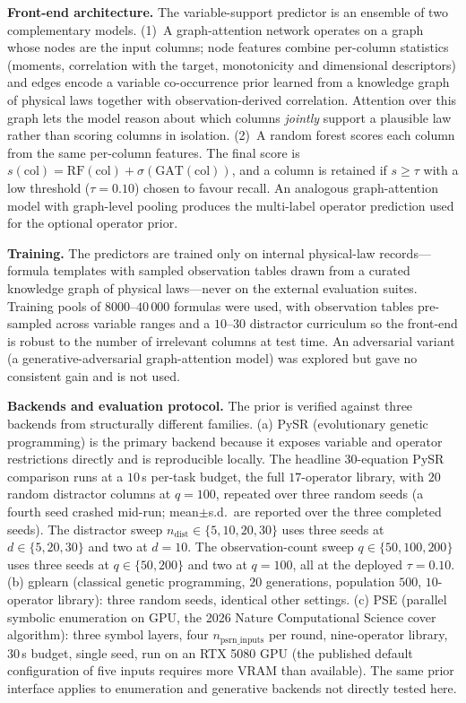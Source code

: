 \documentclass[11pt]{article}
\begin{document}
\noindent\textbf{Front-end architecture.} The variable-support predictor is an
ensemble of two complementary models. (1)~A graph-attention
network\cite{lee2019settransformer,zaheer2017deepsets} operates on a graph whose
nodes are the input columns; node features combine per-column statistics (moments,
correlation with the target, monotonicity and dimensional descriptors) and edges
encode a variable co-occurrence prior learned from a knowledge graph of physical
laws together with observation-derived correlation. Attention over this graph lets
the model reason about which columns \emph{jointly} support a plausible law rather
than scoring columns in isolation. (2)~A random forest scores each column from the
same per-column features. The final score is
$s(\mathrm{col})=\mathrm{RF}(\mathrm{col})+\sigma(\mathrm{GAT}(\mathrm{col}))$, and a
column is retained if $s\ge\tau$ with a low threshold ($\tau=0.10$) chosen to favour
recall. An analogous graph-attention model with graph-level pooling produces the
multi-label operator prediction used for the optional operator prior.

\noindent\textbf{Training.} The predictors are trained only on internal
physical-law records---formula templates with sampled observation tables drawn from
a curated knowledge graph of physical laws---never on the external evaluation suites.
Training pools of $8000$--$40\,000$ formulas were used, with observation tables
pre-sampled across variable ranges and a $10$--$30$ distractor curriculum so the
front-end is robust to the number of irrelevant columns at test time. An adversarial
variant (a generative-adversarial graph-attention model) was explored but gave no
consistent gain and is not used.

\noindent\textbf{Backends and evaluation protocol.} The prior is verified
against three backends from structurally different families. (a)
PySR\cite{cranmer2023pysr} (evolutionary genetic programming) is the primary
backend because it exposes variable and operator restrictions directly and is
reproducible locally. The headline $30$-equation PySR comparison runs at a
$10$\,s per-task budget, the full $17$-operator library, with $20$ random
distractor columns at $q=100$, repeated over three random seeds (a fourth seed
crashed mid-run; mean${\pm}$s.d.\ are reported over the three completed seeds).
The distractor sweep $n_{\mathrm{dist}}\in\{5,10,20,30\}$ uses three seeds at
$d\in\{5,20,30\}$ and two at $d{=}10$. The observation-count sweep
$q\in\{50,100,200\}$ uses three seeds at $q\in\{50,200\}$ and two at $q{=}100$,
all at the deployed $\tau{=}0.10$. (b) gplearn\cite{stephens2015gplearn}
(classical genetic programming, $20$ generations, population $500$,
$10$-operator library): three random seeds, identical other settings. (c)
PSE\cite{ruan2026pse} (parallel symbolic enumeration on GPU, the 2026 Nature
Computational Science cover algorithm): three symbol layers, four
$n_{\mathrm{psrn\_inputs}}$ per round, nine-operator library, $30$\,s budget,
single seed, run on an RTX 5080 GPU (the published default configuration of
five inputs requires more VRAM than available). The same prior interface
applies to enumeration and generative\cite{li2026gensr} backends not directly
tested here.
\end{document}

